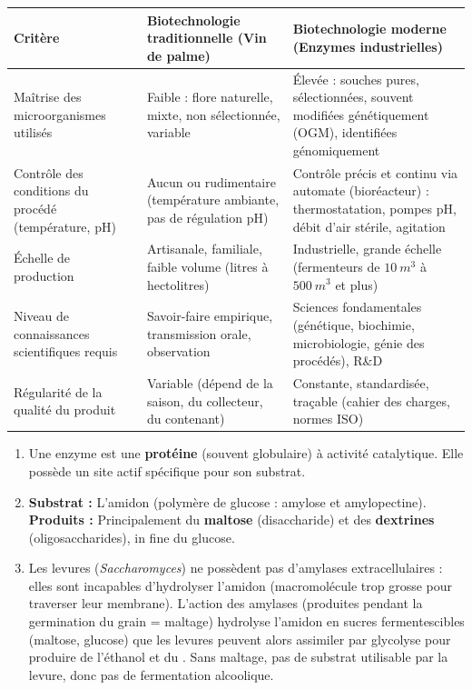 \documentclass[11pt]{article}
\newcommand{\cle}[1]{{\popxbold\color{popdark}#1}}
\begin{document}
\begin{corrige}
\begin{center}
\begin{tabularx}{\linewidth}{|l|X|X|}
\hline
\rowcolor{popblueL} \textbf{Critère} & \textbf{Biotechnologie traditionnelle (Vin de palme)} & \textbf{Biotechnologie moderne (Enzymes industrielles)} \\
\hline
Maîtrise des microorganismes utilisés & Faible : flore naturelle, mixte, non sélectionnée, variable & Élevée : souches pures, sélectionnées, souvent modifiées génétiquement (\cle{OGM}), identifiées génomiquement \\
\hline
Contrôle des conditions du procédé (température, pH) & Aucun ou rudimentaire (température ambiante, pas de régulation pH) & Contrôle précis et continu via automate (\cle{bioréacteur}) : thermostatation, pompes pH, débit d'air stérile, agitation \\
\hline
Échelle de production & Artisanale, familiale, faible volume (litres à hectolitres) & Industrielle, grande échelle (fermenteurs de $\SI{10}{m^3}$ à $\SI{500}{m^3}$ et plus) \\
\hline
Niveau de connaissances scientifiques requis & Savoir-faire empirique, transmission orale, observation & Sciences fondamentales (génétique, biochimie, microbiologie, génie des procédés), R\&D \\
\hline
Régularité de la qualité du produit & Variable (dépend de la saison, du collecteur, du contenant) & Constante, standardisée, traçable (cahier des charges, normes ISO) \\
\hline
\end{tabularx}
\end{center}
\end{corrige}

\begin{corrige}
\begin{enumerate}
\item Une \cle{enzyme} est une \textbf{protéine} (souvent globulaire) à activité catalytique. Elle possède un \cle{site actif} spécifique pour son \cle{substrat}.
\item \textbf{Substrat :} L'\cle{amidon} (polymère de glucose : amylose et amylopectine). \textbf{Produits :} Principalement du \textbf{maltose} (disaccharide) et des \textbf{dextrines} (oligosaccharides), in fine du glucose.
\item Les levures (\emph{Saccharomyces}) ne possèdent pas d'amylases extracellulaires : elles sont incapables d'hydrolyser l'amidon (macromolécule trop grosse pour traverser leur membrane). L'action des amylases (produites pendant la germination du grain = \cle{maltage}) hydrolyse l'amidon en sucres fermentescibles (maltose, glucose) que les levures peuvent alors assimiler par glycolyse pour produire de l'éthanol et du . Sans maltage, pas de substrat utilisable par la levure, donc pas de fermentation alcoolique.
\end{enumerate}
\end{corrige}
\end{document}
